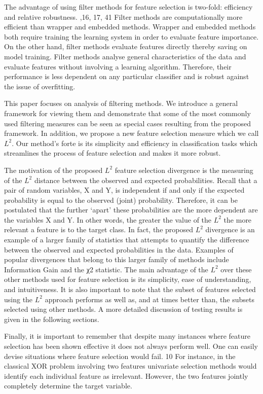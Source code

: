 \documentclass[review]{elsarticle}
\begin{document}
The advantage of using filter methods for feature selection is two-fold: efficiency and relative robustness. \cite{Witten2011,Shahamiri2014a, Kamalov2019},16, 17, 41   Filter methods are computationally more efficient than wrapper and embedded methods. Wrapper and embedded methods both require training the learning system in order to evaluate feature importance. On the other hand, filter methods evaluate features directly thereby saving on model training. Filter methods analyse general characteristics of the data and evaluate features without involving a learning algorithm. Therefore, their performance is less dependent on any particular classifier and is robust against the issue of overfitting. 

This paper focuses on analysis of filtering methods. We introduce a general framework for viewing them and demonstrate that some of the most commonly used filtering measures can be seen as special cases resulting from the proposed framework. In addition, we propose a new feature selection measure which we call $ L^2 $. Our method’s forte is its simplicity and efficiency in classification tasks which streamlines the process of feature selection and makes it more robust. 

The motivation of the proposed $ L^2 $ feature selection divergence is the measuring of the $ L^2 $ distance between the observed and expected probabilities. Recall that a pair of random variables, X and Y, is independent if and only if the expected probability is equal to the observed (joint) probability. Therefore, it can be postulated that the further ‘apart’ these probabilities are the more dependent are the variables X and Y. In other words, the greater the value of the $ L^2 $ the more relevant a feature is to the target class. In fact, the proposed $ L^2 $ divergence is an example of a larger family of statistics that attempts to quantify the difference between the observed and expected probabilities in the data. Examples of popular divergences that belong to this larger family of methods include Information Gain and the χ2 statistic. The main advantage of the $ L^2 $ over these other methods used for feature selection is its simplicity, ease of understanding, and intuitiveness. It is also important to note that the subset of features selected using the $ L^2 $ approach performs as well as, and at times better than, the subsets selected using other methods. A more detailed discussion of testing results is given in the following sections. 

Finally, it is important to remember that despite many instances where feature selection has been shown effective it does not always perform well. One can easily devise situations where feature selection would fail. \cite{Li2017} 10  For instance, in the classical XOR problem involving two features univariate selection methods would identify each individual feature as irrelevant. However, the two features jointly completely determine the target variable. 
\end{document}
